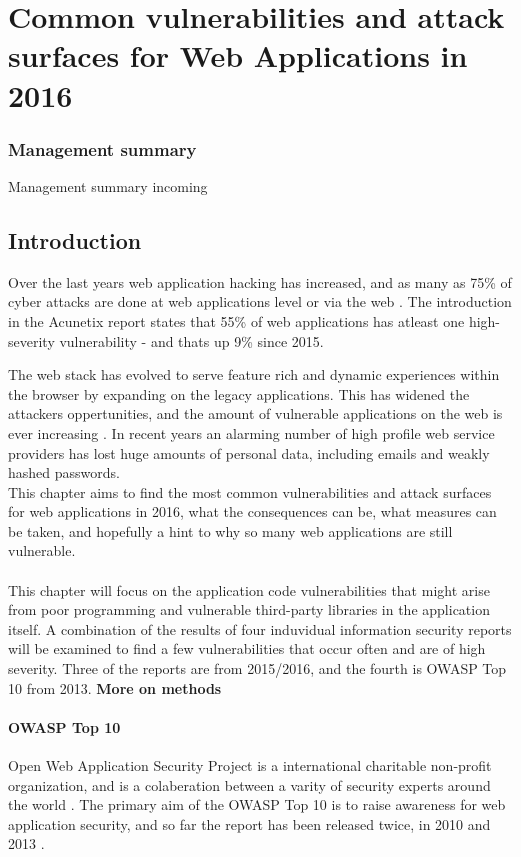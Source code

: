 \chapter[Web Application vulnerabilities in 2016]{Common vulnerabilities and attack surfaces for Web Applications in 2016}

\subsection*{Management summary}
Management summary incoming
\section{Introduction}
Over the last years web application hacking has increased, and as many as 75\% of cyber attacks are done at web applications level or via the web \cite{AcunetixCompany}. The introduction in the Acunetix report states that 55\% of web applications has atleast one high-severity vulnerability - and thats up 9\% since 2015.

The web stack has evolved to serve feature rich and dynamic experiences within the browser by expanding on the legacy applications. This has widened the attackers oppertunities, and the amount of vulnerable applications on the web is ever increasing \cite{Acunetix2016}. In recent years an alarming number of high profile web service providers has lost huge amounts of personal data, including emails and weakly hashed passwords. \\ This chapter aims to find the most common vulnerabilities and attack surfaces for web applications in 2016, what the consequences can be, what measures can be taken, and hopefully a hint to why so many web applications are still vulnerable.
\\ \\
This chapter will focus on the application code vulnerabilities that might arise from poor programming and vulnerable third-party libraries in the application itself. A combination of the results of four induvidual information security reports will be examined to find a few vulnerabilities that occur often and are of high severity. Three of the reports are from 2015/2016, and the fourth is OWASP Top 10 from 2013. \textbf{More on methods}
\subsubsection{OWASP Top 10}
Open Web Application Security Project is a international charitable non-profit organization, and is a colaberation between a varity of security experts around the world \cite{OwaspCompany}. The primary aim of the OWASP Top 10 is to raise awareness for web application security, and so far the report has been released twice, in 2010 and 2013 \cite{OwaspTop10Project}.
